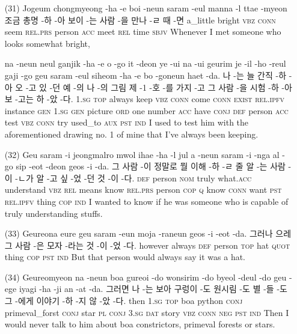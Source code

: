 \begin{itemize}
\item [(31)]
\tgl
		{Jogeum chongmyeong -ha -e boi -neun saram -eul manna -l ttae -myeon}
		{조금 총명 -하 -아 보이 -는 사람 -을 만나 -ㄹ 때 -면}
		{a\_little	bright	\textsc{vbz}	\textsc{conn}	seem	\textsc{rel.prs}	person	\textsc{acc}	meet	\textsc{rel}	time	\textsc{sbjv}}
		{Whenever I met someone who looks somewhat bright,}
		
\tgl
		{na -neun neul ganjik -ha -e o -go it -deon ye -ui na -ui geurim je -il -ho -reul gaji -go geu saram -eul siheom -ha -e bo -goneun haet -da.}
		{나 -는 늘 간직 -하 -아 오 -고 있 -던 예 -의 나 -의 그림 제 -1 -호 -를 가지 -고 그 사람 -을 시험 -하 -아 보 -고는 하 -았 -다.}
		{\textsc{1.sg}	\textsc{top}	always	keep	\textsc{vbz}	\textsc{conn}	come	\textsc{conn}	\textsc{exist}	\textsc{rel.ipfv}	instance	\textsc{gen}	\textsc{1.sg}	\textsc{gen}	picture	\textsc{ord}	one	number	\textsc{acc}	have	\textsc{conj}	\textsc{def}	person	\textsc{acc}	test	\textsc{vbz}	\textsc{conn}	try	used\_to	\textsc{aux}	\textsc{pst}	\textsc{ind}}
		{I used to test him with the aforementioned drawing no. 1 of mine that I've always been keeping.}

\item [(32)]
\tgl
		{Geu saram -i jeongmalro mwol ihae -ha -l jul a -neun saram -i -nga al -go sip -eot -deon geos -i -da.}
		{그 사람 -이 정말로 뭘 이해 -하 -ㄹ 줄 알 -는 사람 -이 -ㄴ가 알 -고 싶 -었 -던 것 -이 -다.}
		{\textsc{def}	person	\textsc{nom}	truly	what.\textsc{acc}	understand	\textsc{vbz}	\textsc{rel}	means	know	\textsc{rel.prs}	person	\textsc{cop}	\textsc{q}	know	\textsc{conn}	want	\textsc{pst}	\textsc{rel.ipfv}	thing	\textsc{cop}	\textsc{ind}}
		{I wanted to know if he was someone who is capable of truly understanding stuffs.}

\item [(33)]
\tgl
		{Geureona eure geu saram -eun moja -raneun geos -i -eot -da.}
		{그러나 으레 그 사람 -은 모자 -라는 것 -이 -었 -다.}
		{however	always	\textsc{def}	person	\textsc{top}	hat	\textsc{quot}	thing	\textsc{cop}	\textsc{pst}	\textsc{ind}}
		{But that person would always say it was a hat.}

\item [(34)]
\tgl
		{Geureomyeon na -neun boa gureoi -do wonsirim -do byeol -deul -do geu -ege iyagi -ha -ji an -at -da.}
		{그러면 나 -는 보아 구렁이 -도 원시림 -도 별 -들 -도 그 -에게 이야기 -하 -지 않 -았 -다.}
		{then	\textsc{1.sg}	\textsc{top}	boa	python	\textsc{conj}	primeval\_forst	\textsc{conj}	star	\textsc{pl}	\textsc{conj}	\textsc{3.sg}	\textsc{dat}	story	\textsc{vbz}	\textsc{conn}	\textsc{neg}	\textsc{pst}	\textsc{ind}}
		{Then I would never talk to him about boa constrictors, primeval forests or stars.}


\end{itemize}
